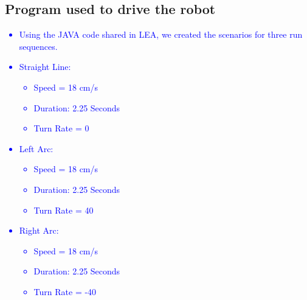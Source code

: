 \documentclass[10pt,a4paper]{article}
\begin{document}
			\subsection{Program used to drive the robot}\textcolor{blue}{
				\begin{itemize}
					\item Using the JAVA code shared in LEA, we created the scenarios for three run sequences.
					\item Straight Line:
						\begin{itemize}
							\item Speed = 18 cm/s
							\item Duration: 2.25 Seconds
							\item Turn Rate = 0
						\end{itemize}
					\item Left Arc:
						\begin{itemize}
							\item Speed = 18 cm/s
							\item Duration: 2.25 Seconds
							\item Turn Rate = 40
						\end{itemize}
					\item Right Arc:
						\begin{itemize}
							\item Speed = 18 cm/s
							\item Duration: 2.25 Seconds
							\item Turn Rate = -40
						\end{itemize}							
				\end{itemize}
			}
\end{document}
